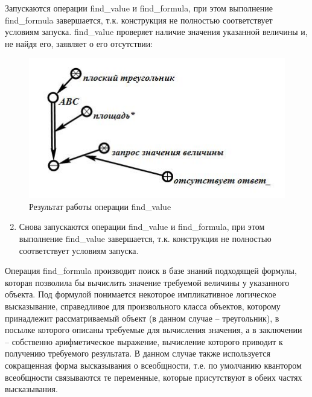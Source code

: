 Запускаются операции find\_value и find\_formula, при этом выполнение find\_formula завершается, т.к. конструкция не полностью соответствует условиям запуска. find\_value проверяет наличие значения указанной величины и, не найдя его, заявляет о его отсутствии:

\begin{figure}[H]
	\includegraphics[scale=0.5]{images/part7/chapter_learning_systems/step3.jpg}
	\caption{Результат работы операции find\_value}
	\label{fig:step3}
\end{figure}

\begin{enumerate}
	\setcounter{enumi}{1}
	\item
	Снова запускаются операции find\_value и find\_formula, при этом выполнение find\_value завершается, т.к. конструкция не полностью соответствует условиям запуска.
\end{enumerate}

Операция find\_formula производит поиск в базе знаний подходящей формулы, которая позволила бы вычислить значение требуемой величины у указанного объекта. Под формулой понимается некоторое импликативное логическое высказывание, справедливое для произвольного класса объектов, которому принадлежит рассматриваемый объект (в данном случае -- треугольник), в посылке которого описаны требуемые для вычисления значения, а в заключении -- собственно арифметическое выражение, вычисление которого приводит к получению требуемого результата. В данном случае также используется сокращенная форма высказывания о всеобщности, т.е. по умолчанию квантором всеобщности связываются те переменные, которые присутствуют в обеих частях высказывания.

